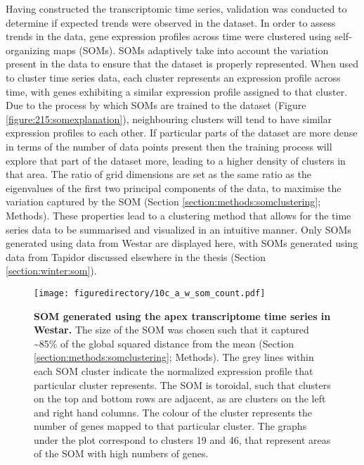 \documentclass[12pt,]{book}
\begin{document}
Having constructed the transcriptomic time series, validation was
conducted to determine if expected trends were observed in the dataset.
In order to assess trends in the data, gene expression profiles across
time were clustered using self-organizing maps (SOMs). SOMs adaptively
take into account the variation present in the data to ensure that the
dataset is properly represented. When used to cluster time series data,
each cluster represents an expression profile across time, with genes
exhibiting a similar expression profile assigned to that cluster. Due to
the process by which SOMs are trained to the dataset (Figure
\ref{figure:215:somexplanation}), neighbouring clusters will tend to
have similar expression profiles to each other. If particular parts of
the dataset are more dense in terms of the number of data points present
then the training process will explore that part of the dataset more,
leading to a higher density of clusters in that area. The ratio of grid
dimensions are set as the same ratio as the eigenvalues of the first two
principal components of the data, to maximise the variation captured by
the SOM (Section \ref{section:methods:somclustering}; Methods). These
properties lead to a clustering method that allows for the time series
data to be summarised and visualized in an intuitive manner. Only SOMs
generated using data from Westar are displayed here, with SOMs generated
using data from Tapidor discussed elsewhere in the thesis (Section
\ref{section:winter:som}).

\begin{figure}[htbp]
\centering
\texttt{[image: figuredirectory/10c\_a\_w\_som\_count.pdf]}
\caption{\textbf{SOM generated using the apex transcriptome time series
in Westar.} The size of the SOM was chosen such that it captured
\textasciitilde{}85\% of the global squared distance from the mean
(Section \ref{section:methods:somclustering}; Methods). The grey lines
within each SOM cluster indicate the normalized expression profile that
particular cluster represents. The SOM is toroidal, such that clusters
on the top and bottom rows are adjacent, as are clusters on the left and
right hand columns. The colour of the cluster represents the number of
genes mapped to that particular cluster. The graphs under the plot
correspond to clusters 19 and 46, that represent areas of the SOM with
high numbers of genes.}\label{figure:216:somaw}
\end{figure}
\end{document}
